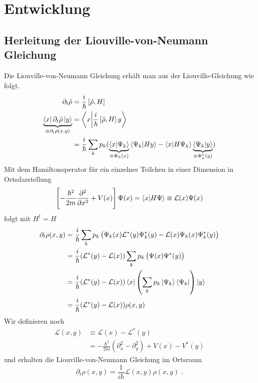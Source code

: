 \chapter{Entwicklung}
\section{Herleitung der Liouville-von-Neumann Gleichung}

Die Liouville-von-Neumann Gleichung erhält man aus der Liouville-Gleichung wie folgt.
\begin{align}
  \partial_t \hat{\rho} &= \frac{i}{\hbar}\left[\hat{\rho} , H\right] \\
  \underbrace{\bra{x} \partial_t \hat{\rho} \ket{y}}_{\equiv \partial_t \rho(x,y)} &= \bra{x}\ket{\frac{i}{\hbar}\left[\hat{\rho} , H\right]y} \\
   &= \frac{i}{\hbar} \sum_k p_k ( \underbrace{\bra{x} \ket{\Psi_k}}_{\equiv \Psi_k(x)}\bra{\Psi_k} \ket{Hy} - \bra{x}\ket{H\Psi_k}\underbrace{\bra{\Psi_k} \ket{y}}_{\equiv \Psi_k^*(y)} )
\end{align}
Mit dem Hamiltonoperator für ein einzelnes Teilchen in einer Dimension in Ortsdarstellung
\begin{align}
  \left[ -\frac{\hbar^2}{2m}\frac{\partial^2}{\partial x^2} + V(x) \right] \Psi(x) = \bra{x}\ket{H\Psi} \equiv \mathcal{L}(x)\Psi(x)
\end{align}
folgt mit $H^{\dagger} = H$
\begin{align}
  \partial_t \rho(x,y) &= \frac{i}{\hbar} \sum_k p_k \left( \Psi_k(x)\mathcal{L}^*(y)\Psi_k^*(y) - \mathcal{L}(x)\Psi_k(x)\Psi_k^*(y) \right) \\
  &= \frac{i}{\hbar}  (\mathcal{L}^*(y) - \mathcal{L}(x)) \sum_k p_k \left( \Psi(x)\Psi^*(y) \right) \\
  &= \frac{i}{\hbar}  (\mathcal{L}^*(y) - \mathcal{L}(x)) \bra{x}\left(\sum_k p_k  \ket{\Psi_k}\bra{\Psi_k} \right)\ket{y} \\
  &= \frac{i}{\hbar}  (\mathcal{L}^*(y) - \mathcal{L}(x))\rho(x,y)
\end{align}
Wir definieren noch
\begin{align}
  \mathcal{L}(x,y) &\equiv \mathcal{L}(x) - \mathcal{L}^*(y)\\
   &= -\frac{\hbar^2}{2m}\left( \partial_x^2 - \partial_y^2 \right) + V(x) - V^*(y)
\end{align}
und erhalten die Liouville-von-Neumann Gleichung im Ortsraum
\begin{equation}
  \partial_t \rho(x,y) = \frac{1}{i\hbar} \mathcal{L}(x,y) \rho(x,y) \; .
\end{equation}


